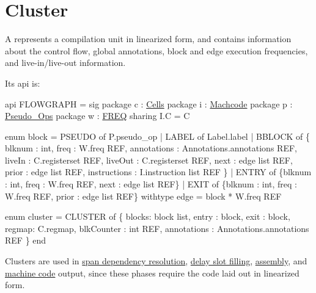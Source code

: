 \section{Cluster}

A 
represents a compilation unit in linearized form,
and contains information about the control flow, global annotations, 
block and edge execution frequencies, and live-in/live-out information.

Its api is:
\begin{SML}
api FLOWGRAPH = sig
  package c : \href{cells.html}{Cells}
  package i : \href{instructions.html}{Machcode}
  package p : \href{pseudo-ops.html}{Pseudo_Ops}
  package w : \href{freq.html}{FREQ}
     sharing I.C = C

  enum block =
      PSEUDO of P.pseudo_op
    | LABEL of Label.label
    | BBLOCK of
        \{ blknum      : int,
          freq        : W.freq REF,
          annotations : Annotations.annotations REF,
	  liveIn      : C.registerset REF,
	  liveOut     : C.registerset REF,
	  next 	      : edge list REF,
	  prior 	      : edge list REF,
	  instructions	      : I.instruction list REF
        \}
    | ENTRY of 
        \{blknum : int, freq : W.freq REF, next : edge list REF\}
    | EXIT of 
        \{blknum : int, freq : W.freq REF, prior : edge list REF\}
  withtype edge = block * W.freq REF

  enum cluster = 
      CLUSTER of \{
        blocks: block list, 
        entry : block,
        exit  : block,	  
        regmap: C.regmap,
        blkCounter : int REF,
        annotations : Annotations.annotations REF
      \}
end
\end{SML}

Clusters are used in
\href{span-dep.html}{span dependency resolution}, 
\href{delayslots.html}{delay slot filling},
\href{asm.html}{assembly}, 
and \href{mc.html}{machine code} 
output, since these phases require the code laid out in linearized form.
